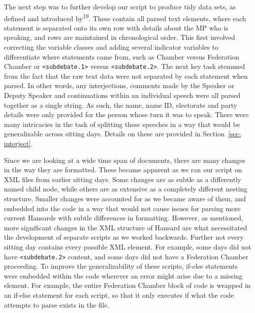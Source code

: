 \documentclass[
  letterpaper,
  DIV=11,
  numbers=noendperiod]{scrartcl}
\begin{document}
The next step was to further develop our script to produce tidy data
sets, as defined and introduced by\textsuperscript{19}. These contain
all parsed text elements, where each statement is separated onto its own
row with details about the MP who is speaking, and rows are maintained
in chronological order. This first involved correcting the variable
classes and adding several indicator variables to differentiate where
statements came from, such as Chamber versus Federation Chamber or
\texttt{\textless{}subdebate.1\textgreater{}} versus
\texttt{\textless{}subdebate.2\textgreater{}}. The next key task stemmed
from the fact that the raw text data were not separated by each
statement when parsed. In other words, any interjections, comments made
by the Speaker or Deputy Speaker and continuations within an individual
speech were all parsed together as a single string. As such, the name,
name ID, electorate and party details were only provided for the person
whose turn it was to speak. There were many intricacies in the task of
splitting these speeches in a way that would be generalizable across
sitting days. Details on these are provided in
Section~\ref{sec-interject}.

Since we are looking at a wide time span of documents, there are many
changes in the way they are formatted. These became apparent as we ran
our script on XML files from earlier sitting days. Some changes are as
subtle as a differently named child node, while others are as extensive
as a completely different nesting structure. Smaller changes were
accounted for as we became aware of them, and embedded into the code in
a way that would not cause issues for parsing more current Hansards with
subtle differences in formatting. However, as mentioned, more
significant changes in the XML structure of Hansard are what
necessitated the development of separate scripts as we worked backwards.
Further not every sitting day contains every possible XML element. For
example, some days did not have
\texttt{\textless{}subdebate.2\textgreater{}} content, and some days did
not have a Federation Chamber proceeding. To improve the
generalizability of these scripts, if-else statements were embedded
within the code wherever an error might arise due to a missing element.
For example, the entire Federation Chamber block of code is wrapped in
an if-else statement for each script, so that it only executes if what
the code attempts to parse exists in the file.
\end{document}
